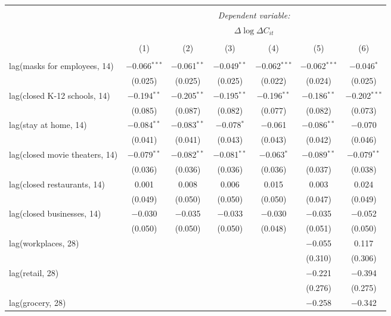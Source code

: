 \begin{tabular}{@{\extracolsep{1pt}}lcccccc} 
\\[-1.8ex]\hline 
\hline \\[-1.8ex] 
 & \multicolumn{6}{c}{\textit{Dependent variable:}} \\ 
\cline{2-7} 
 & \multicolumn{6}{c}{$\Delta \log \Delta C_{it}$} \\ 
\\[-1.8ex] & (1) & (2) & (3) & (4) & (5) & (6)\\ 
\hline \\[-1.8ex] 
 lag(masks for employees, 14) & $-$0.066$^{***}$ & $-$0.061$^{**}$ & $-$0.049$^{**}$ & $-$0.062$^{***}$ & $-$0.062$^{***}$ & $-$0.046$^{*}$ \\ 
  & (0.025) & (0.025) & (0.025) & (0.022) & (0.024) & (0.025) \\ 
  lag(closed K-12 schools, 14) & $-$0.194$^{**}$ & $-$0.205$^{**}$ & $-$0.195$^{**}$ & $-$0.196$^{**}$ & $-$0.186$^{**}$ & $-$0.202$^{***}$ \\ 
  & (0.085) & (0.087) & (0.082) & (0.077) & (0.082) & (0.073) \\ 
  lag(stay at home, 14) & $-$0.084$^{**}$ & $-$0.083$^{**}$ & $-$0.078$^{*}$ & $-$0.061 & $-$0.086$^{**}$ & $-$0.070 \\ 
  & (0.041) & (0.041) & (0.043) & (0.043) & (0.042) & (0.046) \\ 
  lag(closed movie theaters, 14) & $-$0.079$^{**}$ & $-$0.082$^{**}$ & $-$0.081$^{**}$ & $-$0.063$^{*}$ & $-$0.089$^{**}$ & $-$0.079$^{**}$ \\ 
  & (0.036) & (0.036) & (0.036) & (0.036) & (0.037) & (0.038) \\ 
  lag(closed restaurants, 14) & 0.001 & 0.008 & 0.006 & 0.015 & 0.003 & 0.024 \\ 
  & (0.049) & (0.050) & (0.050) & (0.050) & (0.047) & (0.049) \\ 
  lag(closed businesses, 14) & $-$0.030 & $-$0.035 & $-$0.033 & $-$0.030 & $-$0.035 & $-$0.052 \\ 
  & (0.050) & (0.050) & (0.050) & (0.048) & (0.051) & (0.050) \\ 
  lag(workplaces, 28) &  &  &  &  & $-$0.055 & 0.117 \\ 
  &  &  &  &  & (0.310) & (0.306) \\ 
  lag(retail, 28) &  &  &  &  & $-$0.221 & $-$0.394 \\ 
  &  &  &  &  & (0.276) & (0.275) \\ 
  lag(grocery, 28) &  &  &  &  & $-$0.258 & $-$0.342 \\ 

\end{tabular}

